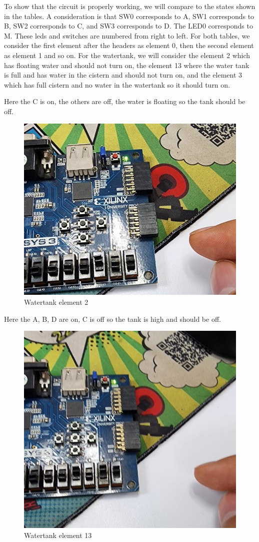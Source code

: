 \documentclass{article}
\begin{document}
\begin{multicols}{2}
	To show that the circuit is properly working, we will compare to the states shown in the tables. A consideration is that SW0 corresponds to A, SW1 corresponds to B, SW2 corresponds to C, and SW3 corresponds to D. The LED0 corresponds to M. These leds and switches are numbered from right to left. For both tables, we consider the first element after the headers as element 0, then the second element as element 1 and so on. For the watertank, we will consider the element 2 which has floating water and should not turn on, the element 13 where the water tank is full and has water in the cistern and should not turn on, and the element 3 which has full cistern and no water in the watertank so it should turn on.

	Here the C is on, the others are off, the water is floating so the tank should be off.

	\begin{figure}[H]
		\centering
		\includegraphics[width=0.8\linewidth]{images/diagrams/watertank/watertank2.jpg}
		\caption{Watertank element 2}
		\label{Watertank element 2}
	\end{figure}

	Here the A, B, D are on, C is off so the tank is high and should be off.

	\begin{figure}[H]
		\centering
		\includegraphics[width=0.8\linewidth]{images/diagrams/watertank/watertank13.jpg}
		\caption{Watertank element 13}
		\label{Watertank element 13}
	\end{figure}


\end{multicols}
\end{document}
